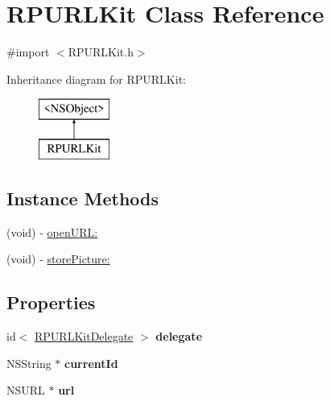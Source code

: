 \hypertarget{interface_r_p_u_r_l_kit}{\section{R\-P\-U\-R\-L\-Kit Class Reference}
\label{interface_r_p_u_r_l_kit}
}


{\ttfamily \#import $<$R\-P\-U\-R\-L\-Kit.\-h$>$}

Inheritance diagram for R\-P\-U\-R\-L\-Kit\-:\begin{figure}[H]
\begin{center}
\leavevmode
\includegraphics[height=2.000000cm]{interface_r_p_u_r_l_kit}
\end{center}
\end{figure}
\subsection*{Instance Methods}
\begin{DoxyCompactItemize}
\item 
(void) -\/ \hyperlink{interface_r_p_u_r_l_kit_ae4234ef492a91ad3f5b8e97bcceef86a}{open\-U\-R\-L\-:}
\item 
(void) -\/ \hyperlink{interface_r_p_u_r_l_kit_a24d388c900534fc44e1e1573e531ea33}{store\-Picture\-:}
\end{DoxyCompactItemize}
\subsection*{Properties}
\begin{DoxyCompactItemize}
\item 
\hypertarget{interface_r_p_u_r_l_kit_a7323834807e726be757e604bf398caca}{id$<$ \hyperlink{protocol_r_p_u_r_l_kit_delegate-p}{R\-P\-U\-R\-L\-Kit\-Delegate} $>$ {\bfseries delegate}}\label{interface_r_p_u_r_l_kit_a7323834807e726be757e604bf398caca}

\item 
\hypertarget{interface_r_p_u_r_l_kit_ae6fe0ba52485ef97ed878f74275cb8d6}{N\-S\-String $\ast$ {\bfseries current\-Id}}\label{interface_r_p_u_r_l_kit_ae6fe0ba52485ef97ed878f74275cb8d6}

\item 
\hypertarget{interface_r_p_u_r_l_kit_a5563f258c4cf8d415afc82e09965aa1f}{N\-S\-U\-R\-L $\ast$ {\bfseries url}}\label{interface_r_p_u_r_l_kit_a5563f258c4cf8d415afc82e09965aa1f}

\end{DoxyCompactItemize}


